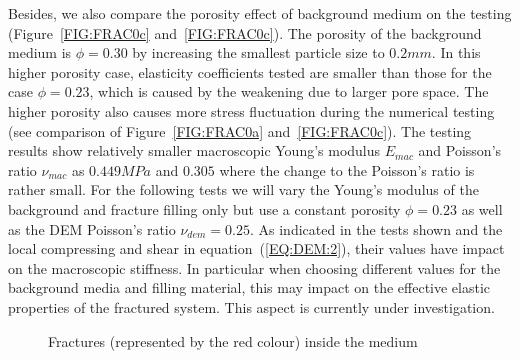 \documentclass[review,authoryear]{elsarticle}
\begin{document}
Besides, we also compare the porosity effect of background medium on the testing (Figure~\ref{FIG:FRAC0c} and~\ref{FIG:FRAC0c}). The porosity of the background medium is $\phi = 0.30$ by increasing the smallest particle size to $0.2mm$. In this higher porosity case, elasticity 
coefficients tested are smaller than those for the case $\phi=0.23$, which is caused by the weakening due to larger pore space. 
The higher porosity also causes more stress fluctuation during the numerical testing (see comparison of Figure~\ref{FIG:FRAC0a} and~\ref{FIG:FRAC0c}). 
The testing results show relatively smaller macroscopic Young's modulus $E_{mac}$ and Poisson's ratio $\nu_{mac}$ as $0.449 MPa$ and $0.305$ where
the change to the Poisson's ratio is rather small. For the following tests we will vary the Young's modulus of the background and fracture filling only but use a constant 
porosity $\phi=0.23$ as well as the DEM Poisson's ratio $\nu_{dem}=0.25$. As indicated in the tests shown and the local compressing and shear in equation~(\ref{EQ:DEM:2}), their values have impact on the macroscopic stiffness. In particular when choosing different values for the background media and filling material, this may impact on the effective elastic properties of the fractured system. This aspect is currently under investigation.  

\begin{figure}[t]
\centering
\caption{Fractures (represented by the red colour) inside the medium}\label{FIG:GEOMETRY}
\end{figure}
\end{document}
